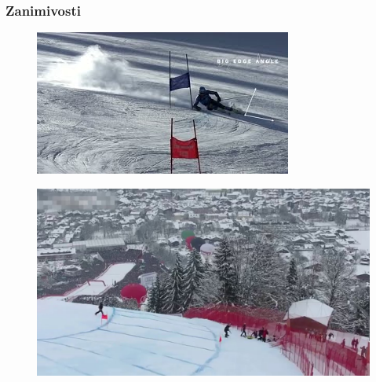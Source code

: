 \documentclass{beamer}
\begin{document}
\begin{frame}
    \frametitle{Zanimivosti}

    \begin{figure}[h]
        \centering
        \href{https://www.youtube.com/watch?v=gz-irSJGehY}{\includegraphics[width=0.8\linewidth]{../images/slika-1.jpg}}
        \label{fig:external_link}
      \end{figure}
      
\begin{figure}[h]
        \centering
        \href{https://www.youtube.com/watch?v=vM_UU11MMH0}{\includegraphics[width=0.8\linewidth]{../images/slika-2.jpg}}
        \label{fig:external_link}
    \end{figure}

\end{frame}
\end{document}
